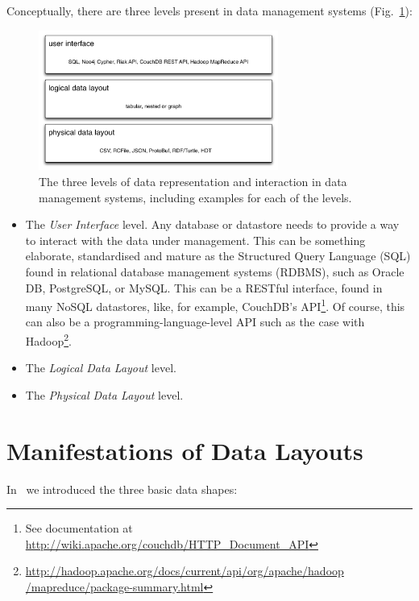 \documentclass{llncs}
\begin{document}
Conceptually, there are three levels present in data management systems
(Fig.~\ref{fig:data-layers}):
\begin{figure}[h!]
\centering
\includegraphics[width=0.7\textwidth]{data-layers}
\caption{The three levels of data representation and interaction in data 
management systems, including examples for each of the levels.}
\label{fig:data-layers}
\end{figure}
\begin{itemize}
\item The \emph{User Interface} level. Any database or datastore needs 
to provide a way to interact with the data under management. This can be 
something elaborate, standardised and mature as the Structured Query Language 
(SQL) found in relational database management systems (RDBMS), such as 
Oracle DB, PostgreSQL, or MySQL. This can be a RESTful interface, found in many 
NoSQL datastores, like, for example, CouchDB's API\footnote{See documentation at
\url{http://wiki.apache.org/couchdb/HTTP_Document_API}}. Of course, this can 
also be a programming-language-level API such as the case with
Hadoop\footnote{\url{http://hadoop.apache.org/docs/current/api/org/apache/hadoop
/mapreduce/package-summary.html}}.
\item The \emph{Logical Data Layout} level.
\item The \emph{Physical Data Layout} level.
\end{itemize}

\section{Manifestations of Data Layouts}
\label{sec:mani}
In~\cite{Hausenblas:arxiv2012} we introduced the three basic data shapes:
\end{document}
